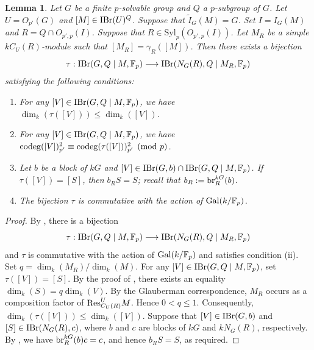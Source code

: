 \documentclass[preprint,12pt,3p]{elsarticle}
\newtheorem{lemma}[theorem]{Lemma}
\def\IBr{{\rm IBr}}
\def\Res{{\rm Res}}
\def\br{{\rm br}}
\def\Gal{{\rm Gal}}
\def\F{\mathbb{F}}
\begin{document}
\begin{lemma}\label{lem:psolvable-turull}
Let $G$ be a finite $p$-solvable group and $Q$ a $p$-subgroup of $G$.
Let $U=O_{p'}(G)$ and $[M] \in \IBr(U)^Q$. Suppose that $\widetilde{I}_G(M)=G$.
Set $I = I_G(M)$ and 
$R=Q\cap O_{p',p}(I)$.
Suppose that $R\in\mathrm{Syl}_p(O_{p',p}(I))$.
Let $M_R$ be a simple
$kC_U(R)$-module such that
$[M_R]=\gamma_R([M])$.
Then there exists a bijection
\[
\tau: \IBr(G,Q\mid M,\F_p) \longrightarrow \IBr(N_G(R),Q\mid M_R,\F_p)
\]
satisfying the following conditions:
\begin{enumerate}[{\rm (i)}]
\item For any $[V]\in\IBr(G,Q\mid M,\F_p)$,
we have
$\dim_k(\tau([V]))
\leq \dim_k([V])$.

\item For any $[V]\in\IBr(G,Q\mid M,\F_p)$,
we have ${\rm codeg}([V])_{p'}^2 \equiv {\rm codeg}(\tau([V]))_{p'}^2 \pmod{p}$.

\item Let $b$ be a block of $kG$ and
$[V]\in\IBr(G,b)\cap\IBr(G,Q\mid M,\F_p)$.
If $\tau([V])=[S]$, then
$b_R S=S$; recall that $b_R:=\br_R^{kG}(b)$.

\item The bijection $\tau$ is commutative with the action of $\Gal(k/\F_p)$.
\end{enumerate}
\end{lemma}

\begin{proof}
By \cite[Theorem 6.1 and \S 2(2")]{Turull14}, there is a bijection 
\[
\tau: \IBr(G,Q\mid M,\F_p) \longrightarrow \IBr(N_G(R),Q\mid M_R,\F_p)
\]
and $\tau$ is commutative with the action of $\Gal(k/\F_p)$ and satisfies condition (ii).
Set $q= \dim_k(M_R) / \dim_k(M)$.
For any $[V] \in \IBr(G,Q\mid M,\F_p)$, set $\tau([V])=[S]$.
By the proof of \cite[Theorem 6.1]{Turull14}, there exists an equality
$\dim_k(S)
=
q
\dim_k(V)$.
By the Glauberman
correspondence, $M_R$ occurs as a
composition factor of
$\Res_{C_U(R)}^U M$.
Hence
$0<q \leq 1$.
Consequently,
$\dim_k(\tau([V]))\leq\dim_k([V])$.
Suppose that $[V]\in\IBr(G,b)$ and
$[S]\in\IBr(N_G(R),c)$, where $b$ and $c$
are blocks of $kG$ and $kN_G(R)$,
respectively.
By \cite[Theorem 6.1(1)]{Turull14},
we have $\br_R^{kG}(b)c=c$,
and hence $b_RS=S$, as required.
\end{proof}
\end{document}
